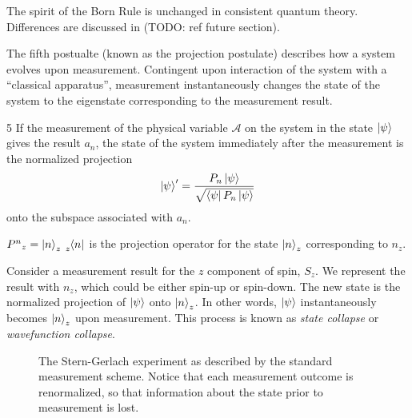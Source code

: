 The spirit of the Born Rule is unchanged in consistent quantum theory. Differences are discussed in (TODO: ref future section).


The fifth postualte (known as the projection postulate) describes how a system evolves upon measurement. Contingent upon interaction of the system with a ``classical apparatus'', measurement instantaneously changes the state of the system to the eigenstate corresponding to the measurement result.

\begin{Thm:Postulate}{5}
    If the measurement of the physical variable $\mathcal{A}$ on the system in the state $\ket{\psi}$ gives the result $a_n$, the state of the system immediately after the measurement is the normalized projection
    \begin{align}
        \ket{\psi}^\prime = \frac{P_n\ket{\psi}}{\sqrt{\bra{\psi}P_n\ket{\psi}
        }}
    \end{align}
    onto the subspace associated with $a_n$.
\end{Thm:Postulate}

${P^n}_z = \ket{n}_z\tensor[_z]{\bra{n}}{}$ is the projection operator for the state $\ket{n}_z$ corresponding to $n_z$.

Consider a measurement result for the $z$ component of spin, $S_z$. We represent the result with $n_z$, which could be either spin-up or spin-down. The new state is the normalized projection of $\ket{\psi}$ onto $\ket{n}_z$. In other words, $\ket{\psi}$ instantaneously becomes $\ket{n}_z$ upon measurement. This process is known as \textit{state collapse} or \textit{wavefunction collapse}.

\begin{figure}
\centering\CaptionFontSize
{}
\caption[Insert an abbreviated caption here to show in the List of Figures]
{The Stern-Gerlach experiment as described by the standard measurement scheme. Notice that each measurement
outcome is renormalized, so that information about the state prior to measurement is lost.}
\label{Figure:Measurement:Renormalizing}
\end{figure}

